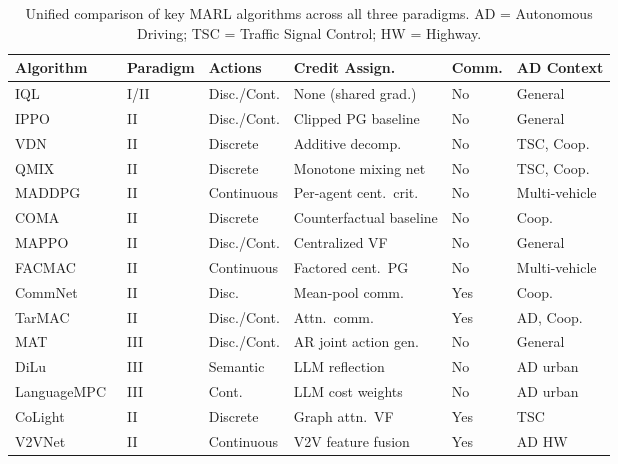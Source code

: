 \documentclass[12pt, a4paper]{article}
\begin{document}
\begin{table}[ht]
\centering
\caption{Unified comparison of key MARL algorithms across all three paradigms.
AD = Autonomous Driving; TSC = Traffic Signal Control; HW = Highway.
\label{tab:unified_comparison}}
\renewcommand{\arraystretch}{1.25}
\small
\begin{tabular}{llllll}
\toprule
\textbf{Algorithm} & \textbf{Paradigm} & \textbf{Actions} & \textbf{Credit Assign.} &
\textbf{Comm.} & \textbf{AD Context} \\
\midrule
IQL~\cite{tan1993multi}        & I/II & Disc./Cont. & None (shared grad.)   & No  & General \\
IPPO~\cite{de2020independent}  & II   & Disc./Cont. & Clipped PG baseline   & No  & General \\
VDN~\cite{sunehag2018value}    & II   & Discrete    & Additive decomp.      & No  & TSC, Coop. \\
QMIX~\cite{rashid2018qmix}    & II   & Discrete    & Monotone mixing net   & No  & TSC, Coop. \\
MADDPG~\cite{lowe2017multi}   & II   & Continuous  & Per-agent cent.\ crit.& No  & Multi-vehicle \\
COMA~\cite{foerster2018counterfactual} & II & Discrete & Counterfactual baseline & No & Coop. \\
MAPPO~\cite{yu2021surprising}  & II   & Disc./Cont. & Centralized VF        & No  & General \\
FACMAC~\cite{peng2021facmac}  & II   & Continuous  & Factored cent.\ PG    & No  & Multi-vehicle \\
CommNet~\cite{sukhbaatar2016learning} & II & Disc.  & Mean-pool comm.       & Yes & Coop. \\
TarMAC~\cite{das2019tarmac}   & II   & Disc./Cont. & Attn.\ comm.          & Yes & AD, Coop. \\
MAT~\cite{wen2022multi}        & III  & Disc./Cont. & AR joint action gen.  & No  & General \\
DiLu~\cite{wen2023dilu}        & III  & Semantic    & LLM reflection        & No  & AD urban \\
LanguageMPC~\cite{sha2023languagempc} & III & Cont. & LLM cost weights      & No  & AD urban \\
CoLight~\cite{wei2019colight}  & II   & Discrete    & Graph attn.\ VF       & Yes & TSC \\
V2VNet~\cite{wang2020v2vnet}  & II   & Continuous  & V2V feature fusion    & Yes & AD HW \\
\bottomrule
\end{tabular}
\end{table}
\end{document}

